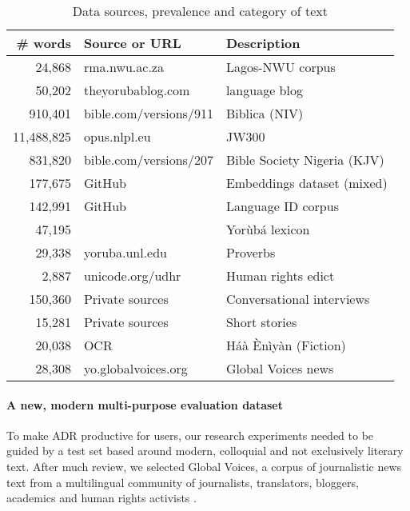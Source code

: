 \documentclass{article} %
\begin{document}
 \begin{table}[h]
  \caption{Data sources, prevalence and category of text}
  \label{tab:training_datasets}
  \begin{center}
  \begin{tabular}{rll}
    \toprule
    \textbf{\# words} & \textbf{Source or URL}  & \textbf{Description} \\
    \midrule
    24,868 & rma.nwu.ac.za  & Lagos-NWU corpus \\  
    50,202 & theyorubablog.com & language blog \\ 
    910,401 & bible.com/versions/911 & Biblica (NIV) \\
    \midrule
    11,488,825 & opus.nlpl.eu & JW300 \\
    831,820 & bible.com/versions/207 & Bible Society Nigeria (KJV)\\
    177,675 & GitHub & Embeddings dataset (mixed) \\
    142,991 & GitHub & Language ID corpus \\
    47,195 &  & Yor{\`u}b{\'a} lexicon \\
    29,338 & yoruba.unl.edu & Proverbs \\
    2,887 & unicode.org/udhr & Human rights edict \\
    \midrule
    150,360 & Private sources & Conversational interviews \\
    15,281 & Private sources & Short stories \\
    20,038 & OCR & H{\'a}{\`a} {\`E}n{\`i}y{\`a}n (Fiction) \\
    \midrule
    \midrule
    28,308 & yo.globalvoices.org & Global Voices news \\
    \bottomrule
  \end{tabular} 
  \end{center}
\end{table}

\paragraph{A new, modern multi-purpose evaluation dataset}\label{sec:evaldataset} To make ADR productive for users, our research experiments needed to be guided by a test set based around modern, colloquial and not exclusively literary text. After much review, we selected Global Voices, a corpus of journalistic news text %
from a multilingual community of journalists, translators, bloggers, academics and human rights activists \citep{global_voices}.
\end{document}
